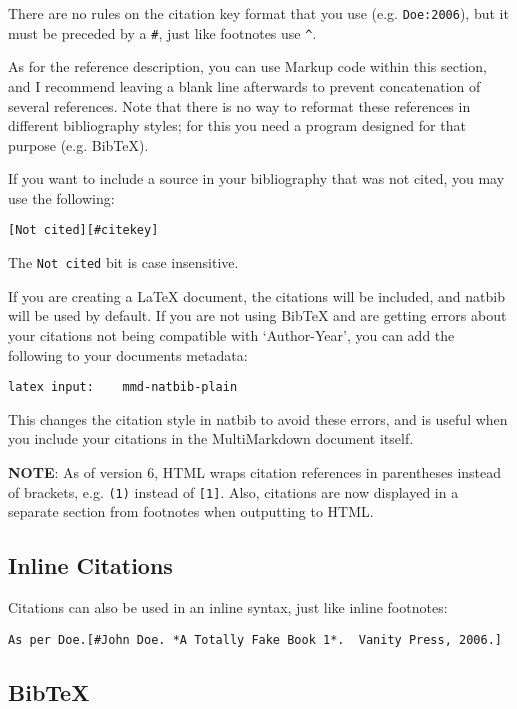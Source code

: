 There are no rules on the citation key format that you use (e.g. \texttt{Doe:2006}), but it must be preceded by a \texttt{\#}, just like footnotes use \texttt{\^{}}.

As for the reference description, you can use Markup code within this section, and I recommend leaving a blank line afterwards to prevent concatenation of several references. Note that there is no way to reformat these references in different bibliography styles; for this you need a program designed for that purpose (e.g. BibTeX).

If you want to include a source in your bibliography that was not cited, you may use the following:

\begin{verbatim}
[Not cited][#citekey]
\end{verbatim}

The \texttt{Not cited} bit is case insensitive.

If you are creating a LaTeX document, the citations will be included, and natbib will be used by default. If you are not using BibTeX and are getting errors about your citations not being compatible with `Author-Year', you can add the following to your documents metadata:

\begin{verbatim}
latex input:	mmd-natbib-plain
\end{verbatim}

This changes the citation style in natbib to avoid these errors, and is useful when you include your citations in the MultiMarkdown document itself.

\textbf{NOTE}: As of version 6, HTML wraps citation references in parentheses instead of brackets, e.g. \texttt{(1)} instead of \texttt{[1]}. Also, citations are now displayed in a separate section from footnotes when outputting to HTML.

\subsection{Inline Citations}
\label{inlinecitations}

Citations can also be used in an inline syntax, just like inline footnotes:

\begin{verbatim}
As per Doe.[#John Doe. *A Totally Fake Book 1*.  Vanity Press, 2006.]
\end{verbatim}

\subsection{BibTeX}
\label{bibtex}

